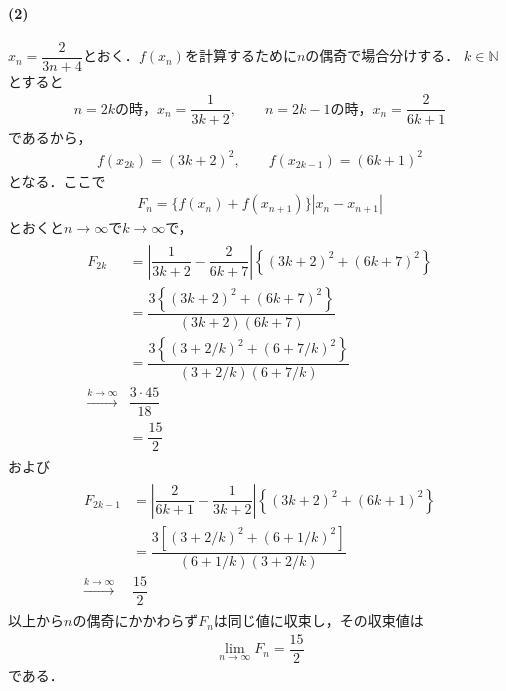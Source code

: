 \documentclass[../../main.tex]{subfiles}
\begin{document}
\paragraph{(2)}
$x_n=\dfrac{2}{3n+4}$とおく．$f(x_n)$を計算するために$n$の偶奇で場合分けする．
$k\in\mathbb{N}$とすると
\begin{align}
  n=2k\text{の時，}x_n=\dfrac{1}{3k+2}, \qquad n=2k-1\text{の時，}x_n=\dfrac{2}{6k+1}
\end{align}
であるから，
\begin{align}
  f(x_{2k}) = \left(3k+2\right)^2, \qquad f(x_{2k-1}) = \left(6k+1\right)^2
\end{align}
となる．ここで
\begin{align}
  F_n=\{f(x_n)+f(x_{n+1})\}|x_n-x_{n+1}|
\end{align}
とおくと$n\to\infty$で$k\to\infty$で，
\begin{align}
  \begin{split}
    F_{2k}
    &=\left|\dfrac{1}{3k+2}-\dfrac{2}{6k+7}\right|\left\{(3k+2)^2+(6k+7)^2\right\} \\
    &=\dfrac{3\left\{(3k+2)^2+(6k+7)^2\right\}}{(3k+2)(6k+7)} \\
    &=\dfrac{3\left\{(3+2/k)^2+(6+7/k)^2\right\}}{(3+2/k)(6+7/k)} \\
    \xrightarrow{k\to\infty}
    &\dfrac{3\cdot45}{18} \\
    &=\dfrac{15}{2}
  \end{split}
\end{align}
および
\begin{align}
  \begin{split}
    F_{2k-1}
    &=\left|\dfrac{2}{6k+1}-\dfrac{1}{3k+2}\right|\left\{(3k+2)^2+(6k+1)^2\right\} \\
    &=\dfrac{3\left[(3+2/k)^2+(6+1/k)^2\right]}{(6+1/k)(3+2/k)} \\
    \xrightarrow{k\to\infty}
    &\dfrac{15}{2}
  \end{split}
\end{align}
以上から$n$の偶奇にかかわらず$F_n$は同じ値に収束し，その収束値は
\begin{align}
  \lim_{n\to\infty} F_n=\dfrac{15}{2}
\end{align}
である．

\newpage
\end{document}
